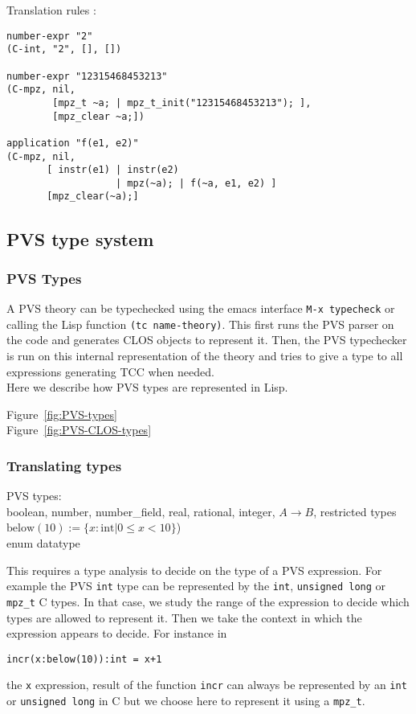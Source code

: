 \documentclass[12pt,a4paper]{article}
\newcommand{\cl}[1]{\texttt{#1}}
\begin{document}
Translation rules :




\begin{lstlisting}
number-expr "2"
(C-int, "2", [], [])

number-expr "12315468453213"
(C-mpz, nil,
        [mpz_t ~a; | mpz_t_init("12315468453213"); ],
        [mpz_clear ~a;])

application "f(e1, e2)"
(C-mpz, nil,
       [ instr(e1) | instr(e2)
                   | mpz(~a); | f(~a, e1, e2) ]
       [mpz_clear(~a);]
\end{lstlisting}



\subsection{PVS type system}

\subsubsection{PVS Types}
A PVS theory can be typechecked using the emacs interface \cl{M-x typecheck} or calling the Lisp function \cl{(tc name-theory)}. This first runs the PVS parser on the code and generates CLOS objects to represent it. Then, the PVS typechecker is run on this internal representation of the theory and tries to give a type to all expressions generating TCC when needed.\\

Here we describe how PVS types are represented in 
Lisp.

Figure~\ref{fig:PVS-types} \\
Figure~\ref{fig:PVS-CLOS-types}


\subsubsection{Translating types}
PVS types:\\
boolean, number, number\_field, real, 
rational, integer, $A \rightarrow B$, restricted types
$\text{below}(10) := \{ x:\text{int} | 0 \leq x < 10 \} $)  \\
enum
datatype


This requires a type analysis to decide on the type of a PVS expression. For example the PVS \cl{int} type can be represented by the \cl{int}, \cl{unsigned long} or \cl{mpz\_t} C types. In that case, we study the range of the expression to decide which types are allowed to represent it. Then we take the context in which the expression appears to decide. For instance in
\begin{lstlisting}
incr(x:below(10)):int = x+1
\end{lstlisting}
the \cl{x} expression, result of the function \cl{incr} can always be represented by an \cl{int} or \cl{unsigned long} in C but we choose here to represent it using a \cl{mpz\_t}.
\end{document}
